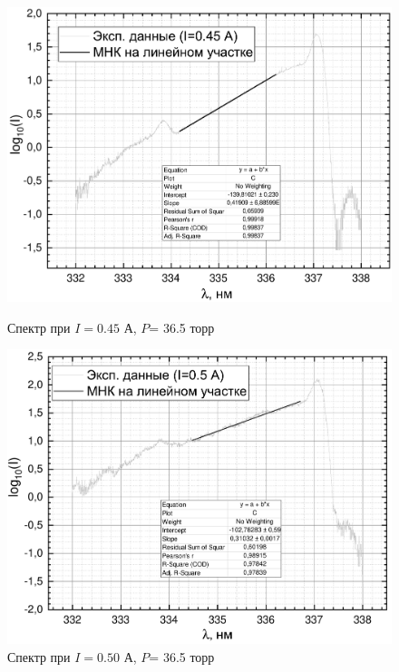 \begin{figure}[h]
	\begin{minipage}{0.45\linewidth}
		\centering
		\includegraphics[width=\linewidth]{data/graph_I=0,45_polosa}
		\caption{Спектр при $I= 0.45$ А, $P$= 36.5 торр}
		\label{polosa_45}
	\end{minipage} 
	\hfill
	\begin{minipage}[H]{0.45\linewidth}
		\centering
		\includegraphics[width=\linewidth]{data/graph_I=0,50_polosa}
		\caption{Спектр при $I= 0.50 $ А, $P$= 36.5 торр}
		\label{polosa_50}
	\end{minipage}
	\begin{minipage}{0.45\linewidth}
		\centering

\end{minipage}
\end{figure}
